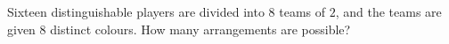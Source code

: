 Sixteen distinguishable players are divided into $8$ teams of $2$, and the teams are given $8$ distinct colours. How many arrangements are possible?
